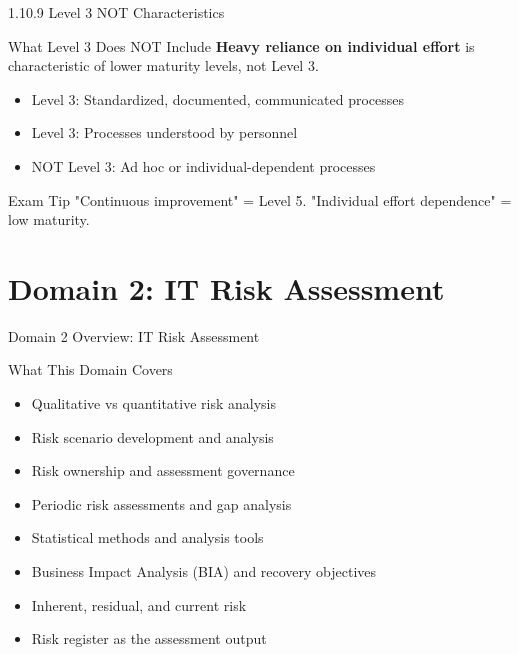 \documentclass{beamer}
\begin{document}
	\begin{frame}{1.10.9 Level 3 NOT Characteristics}
		\begin{block}{What Level 3 Does NOT Include}
			\textbf{Heavy reliance on individual effort} is characteristic of lower maturity levels, not Level 3.
		\end{block}
		\begin{itemize}
			\item Level 3: Standardized, documented, communicated processes
			\item Level 3: Processes understood by personnel
			\item NOT Level 3: Ad hoc or individual-dependent processes
		\end{itemize}
		\begin{alertblock}{Exam Tip}
			"Continuous improvement" = Level 5. "Individual effort dependence" = low maturity.
		\end{alertblock}
	\end{frame}
	
	
	\section{Domain 2: IT Risk Assessment}
	
	\begin{frame}{Domain 2 Overview: IT Risk Assessment}
		\begin{block}{What This Domain Covers}
			\begin{itemize}
				\item Qualitative vs quantitative risk analysis
				\item Risk scenario development and analysis
				\item Risk ownership and assessment governance
				\item Periodic risk assessments and gap analysis
				\item Statistical methods and analysis tools
				\item Business Impact Analysis (BIA) and recovery objectives
				\item Inherent, residual, and current risk
				\item Risk register as the assessment output
			\end{itemize}
		\end{block}
	\end{frame}
	
\end{document}
